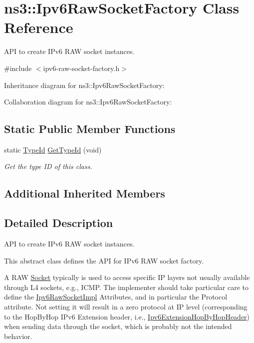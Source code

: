 \hypertarget{classns3_1_1Ipv6RawSocketFactory}{}\section{ns3\+:\+:Ipv6\+Raw\+Socket\+Factory Class Reference}
\label{classns3_1_1Ipv6RawSocketFactory}


A\+PI to create I\+Pv6 R\+AW socket instances.  




{\ttfamily \#include $<$ipv6-\/raw-\/socket-\/factory.\+h$>$}



Inheritance diagram for ns3\+:\+:Ipv6\+Raw\+Socket\+Factory\+:


Collaboration diagram for ns3\+:\+:Ipv6\+Raw\+Socket\+Factory\+:
\subsection*{Static Public Member Functions}
\begin{DoxyCompactItemize}
\item 
static \hyperlink{classns3_1_1TypeId}{Type\+Id} \hyperlink{classns3_1_1Ipv6RawSocketFactory_a0f049b745123befc2efaf4c5f5141f90}{Get\+Type\+Id} (void)
\begin{DoxyCompactList}\small\item\em Get the type ID of this class. \end{DoxyCompactList}\end{DoxyCompactItemize}
\subsection*{Additional Inherited Members}


\subsection{Detailed Description}
A\+PI to create I\+Pv6 R\+AW socket instances. 

This abstract class defines the A\+PI for I\+Pv6 R\+AW socket factory.

A R\+AW \hyperlink{classns3_1_1Socket}{Socket} typically is used to access specific IP layers not usually available through L4 sockets, e.\+g., I\+C\+MP. The implementer should take particular care to define the \hyperlink{classns3_1_1Ipv6RawSocketImpl}{Ipv6\+Raw\+Socket\+Impl} Attributes, and in particular the Protocol attribute. Not setting it will result in a zero protocol at IP level (corresponding to the Hop\+By\+Hop I\+Pv6 Extension header, i.\+e., \hyperlink{classns3_1_1Ipv6ExtensionHopByHopHeader}{Ipv6\+Extension\+Hop\+By\+Hop\+Header}) when sending data through the socket, which is probably not the intended behavior.

